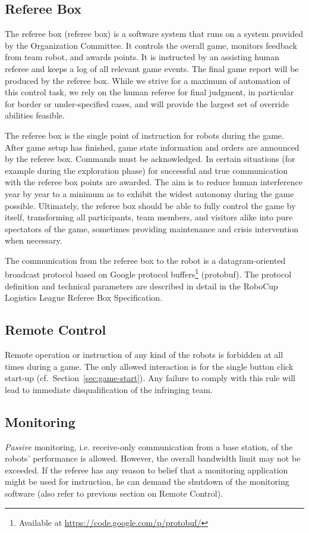 \documentclass[12pt,twoside]{article}
\newcommand{\refsec}[1]{Section~\ref{#1}}
\begin{document}
\subsection{Referee Box}
\label{sec:referee box}
The referee box (referee box) is a software system that runs on a system
provided by the Organization Committee. It controls the overall game,
monitors feedback from team robot, and awards points. It is instructed
by an assisting human referee and keeps a log of all relevant game
events. The final game report will be produced by the referee box. While we
strive for a maximum of automation of this control task, we rely on
the human referee for final judgment, in particular for border or
under-specified cases, and will provide the largest set of override
abilities feasible.

The referee box is the single point of instruction for robots during the
game. After game setup has finished, game state information and orders
are announced by the referee box. Commands must be acknowledged. In certain
situations (for example during the exploration phase) for successful
and true communication with the referee box points are awarded. The aim is
to reduce human interference year by year to a minimum as to exhibit
the widest autonomy during the game possible. Ultimately, the referee box
should be able to fully control the game by itself, transforming all
participants, team members, and visitors alike into pure spectators of
the game, sometimes providing maintenance and crisis intervention when
necessary.

The communication from the referee box to the robot is a datagram-oriented
broadcast protocol based on Google protocol buffers\footnote{Available
  at \url{https://code.google.com/p/protobuf/}} (protobuf). The
protocol definition and technical parameters are described in detail
in the RoboCup Logistics League Referee Box Specification.

\subsection{Remote Control}
\label{sec:remote-control}
Remote operation or instruction of any kind of the robots is forbidden
at all times during a game. The only allowed interaction is for the
single button click start-up (cf.~\refsec{sec:game-start}). Any
failure to comply with this rule will lead to immediate
disqualification of the infringing team.

\subsection{Monitoring}
\label{sec:monitoring}
\emph{Passive} monitoring, i.e. receive-only communication from a base
station, of the robots' performance is allowed. However, the overall
bandwidth limit may not be exceeded.
If the referee has any reason to belief that a monitoring application
might be used for instruction, he can demand the shutdown of the
monitoring software (also refer to previous section on Remote
Control).
\end{document}
